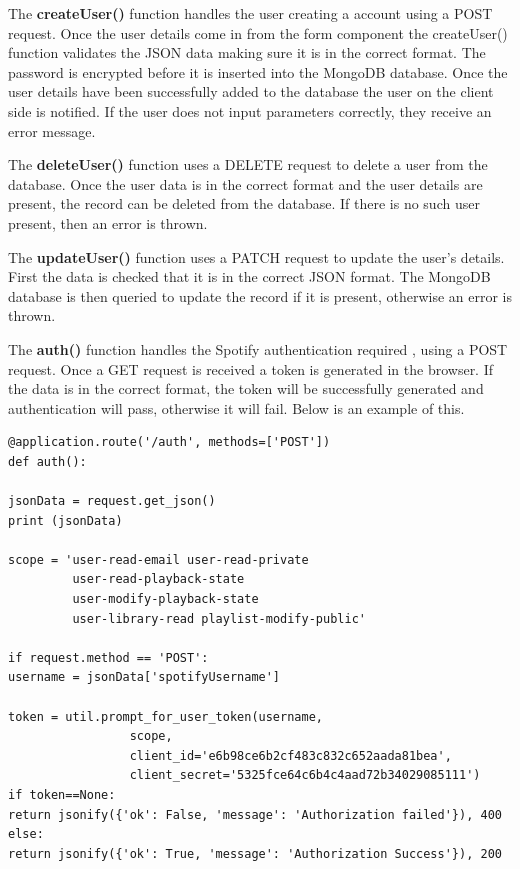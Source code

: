The \textbf{createUser()} function handles the user creating a account using a POST request. Once the user details come in from the form component the createUser() function validates the JSON data making sure it is in the correct format. The password is encrypted before it is inserted into the MongoDB database. Once the user details have been successfully added to the database the user on the client side is notified. If the user does not input parameters correctly, they receive an error message.\newline

The \textbf{deleteUser()} function uses a DELETE request to delete a user from the database. Once the user data is in the correct format and the user details are present, the record can be deleted from the database. If there is no such user present, then an error is thrown.\newline

The \textbf{updateUser()} function uses a PATCH request to update the user’s details. First the data is checked that it is in the correct JSON format. The MongoDB database is then queried to update the record if it is present, otherwise an error is thrown.\newline

The \textbf{auth()} function handles the Spotify authentication required , using a POST request. Once a GET request is received a token is generated in the browser. If the data is in the correct format, the token will be successfully generated and authentication will pass, otherwise it will fail.\newline
Below is an example of this.\newline
\begin{verbatim}
@application.route('/auth', methods=['POST'])
def auth():

jsonData = request.get_json()
print (jsonData)

scope = 'user-read-email user-read-private 
         user-read-playback-state 
         user-modify-playback-state 
         user-library-read playlist-modify-public'

if request.method == 'POST':
username = jsonData['spotifyUsername']

token = util.prompt_for_user_token(username,
                 scope,
                 client_id='e6b98ce6b2cf483c832c652aada81bea',
                 client_secret='5325fce64c6b4c4aad72b34029085111')
if token==None:
return jsonify({'ok': False, 'message': 'Authorization failed'}), 400
else:
return jsonify({'ok': True, 'message': 'Authorization Success'}), 200


\end{verbatim}


